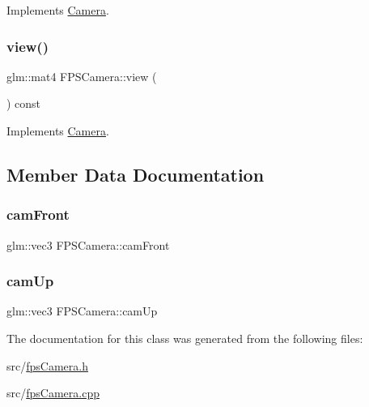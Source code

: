 Implements \hyperlink{classCamera_a3ec282533cfc02be93006259d383b6d2}{Camera}.

\mbox{\label{classFPSCamera_a41a04414a362e7aa866d490900830cb8}} 
\subsubsection{\texorpdfstring{view()}{view()}}
{\footnotesize\ttfamily glm\+::mat4 F\+P\+S\+Camera\+::view (\begin{DoxyParamCaption}{ }\end{DoxyParamCaption}) const\hspace{0.3cm}{\ttfamily [virtual]}}



Implements \hyperlink{classCamera_a279a5a9fdcdb6161bab2c3ff8fce275b}{Camera}.



\subsection{Member Data Documentation}
\mbox{\label{classFPSCamera_a0f5edc21e058e893866ab7479b275a9a}} 
\subsubsection{\texorpdfstring{cam\+Front}{camFront}}
{\footnotesize\ttfamily glm\+::vec3 F\+P\+S\+Camera\+::cam\+Front}

\mbox{\label{classFPSCamera_aa0ec22bd80a3e35f6b2ae12f830c07c4}} 
\subsubsection{\texorpdfstring{cam\+Up}{camUp}}
{\footnotesize\ttfamily glm\+::vec3 F\+P\+S\+Camera\+::cam\+Up}



The documentation for this class was generated from the following files\+:\begin{DoxyCompactItemize}
\item 
src/\hyperlink{fpsCamera_8h}{fps\+Camera.\+h}\item 
src/\hyperlink{fpsCamera_8cpp}{fps\+Camera.\+cpp}\end{DoxyCompactItemize}
